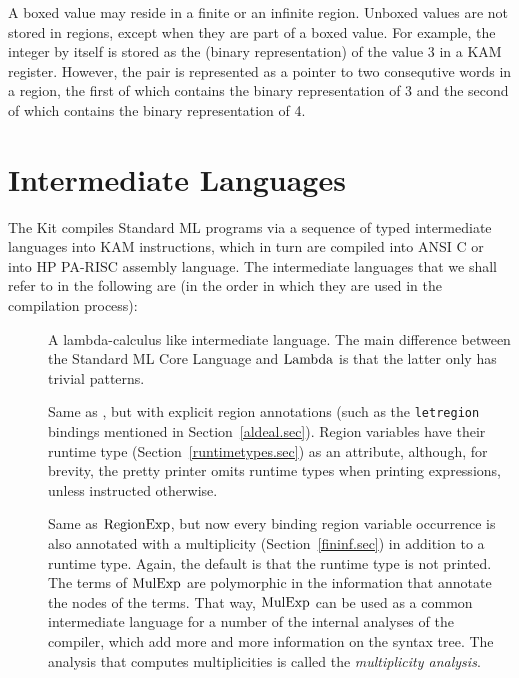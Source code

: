 \documentclass[12pt]{book}
\begin{document}
A boxed value may reside in a finite or an infinite region.
Unboxed values are not stored in regions, except when they
are part of a boxed value. For example, the integer  by itself
is stored as the (binary representation) of the value 3 in a
KAM register. However, the pair  is represented as a
pointer to two consequtive words in a region, the first of which contains
the binary representation of 3 and the second of which contains the binary
representation of 4.

\section{Intermediate Languages}
The Kit compiles Standard ML programs via a sequence of typed intermediate 
languages into  KAM instructions, which in turn are compiled into ANSI C or into HP 
PA-RISC assembly language.
The intermediate languages that
we shall refer to in the following are (in the order in which they are used in the
compilation process):
\begin{description}
\item[\Lam] A lambda-calculus like intermediate language. The main difference between
  the Standard ML Core Language and $\hbox{\rm Lambda}$ is that the latter only has trivial patterns.
\item[\RegExp] Same as \Lam, 
but with explicit region annotations (such as the {\tt letregion} bindings
mentioned in Section~\ref{aldeal.sec}). Region variables have their runtime type (Section~\ref{runtimetypes.sec})
as an attribute, although, for brevity, the pretty printer omits runtime types when printing expressions, 
unless instructed otherwise.
\item[\MulExp] Same as $\hbox{\rm RegionExp}$, but now every binding region variable occurrence
is also annotated with a multiplicity (Section~\ref{fininf.sec}) in addition to a runtime type.
Again, the default is that the runtime type is not printed. The terms of $\hbox{\rm MulExp}$ are polymorphic 
in the information that annotate the nodes of the terms. That way, $\hbox{\rm MulExp}$ can be used
as a common intermediate language for a number of the internal analyses of the compiler, which
add more and more information on the syntax tree.
The analysis that computes multiplicities is called the 
%
{\em multiplicity analysis}.
\end{description}
\end{document}
